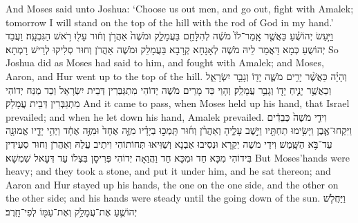 {{And Moses said unto Joshua: ‘Choose us out men, and go out, fight with Amalek; tomorrow I will stand on the top of the hill with the rod of God in my hand.’}{}
{וַיַּ֣עַשׂ יְהוֹשֻׁ֗עַ כַּאֲשֶׁ֤ר אָֽמַר־לוֹ֙ מֹשֶׁ֔ה לְהִלָּחֵ֖ם בַּעֲמָלֵ֑ק וּמֹשֶׁה֙ אַהֲרֹ֣ן וְח֔וּר עָל֖וּ רֹ֥אשׁ הַגִּבְעָֽה׃
}
{וַעֲבַד יְהוֹשֻעַ כְּמָא דַּאֲמַר לֵיהּ מֹשֶׁה לְאָגָחָא קְרָבָא בַּעֲמָלֵק וּמֹשֶׁה אַהֲרֹן וְחוּר סְלִיקוּ לְרֵישׁ רָמְתָא׃}
{So Joshua did as Moses had said to him, and fought with Amalek; and Moses, Aaron, and Hur went up to the top of the hill.}{}
{וְהָיָ֗ה כַּאֲשֶׁ֨ר יָרִ֥ים מֹשֶׁ֛ה יָד֖וֹ וְגָבַ֣ר יִשְׂרָאֵ֑ל וְכַאֲשֶׁ֥ר יָנִ֛יחַ יָד֖וֹ וְגָבַ֥ר עֲמָלֵֽק׃
}
{וְהָוֵי כַּד מָרֵים מֹשֶׁה יְדוֹהִי מִתְגַּבְּרִין דְּבֵית יִשְׂרָאֵל וְכַד מַנַּח יְדוֹהִי מִתְגַּבְּרִין דְּבֵית עֲמָלֵק׃}
{And it came to pass, when Moses held up his hand, that Israel prevailed; and when he let down his hand, Amalek prevailed.}{}
{וִידֵ֤י מֹשֶׁה֙ כְּבֵדִ֔ים וַיִּקְחוּ־אֶ֛בֶן וַיָּשִׂ֥ימוּ תַחְתָּ֖יו וַיֵּ֣שֶׁב עָלֶ֑יהָ וְאַהֲרֹ֨ן וְח֜וּר תָּֽמְכ֣וּ בְיָדָ֗יו מִזֶּ֤ה אֶחָד֙ וּמִזֶּ֣ה אֶחָ֔ד וַיְהִ֥י יָדָ֛יו אֱמוּנָ֖ה עַד־בֹּ֥א הַשָּֽׁמֶשׁ׃
}
{וִידֵי מֹשֶׁה יְקַרָא וּנְסִיבוּ אַבְנָא וְשַׁוִּיאוּ תְּחוֹתוֹהִי וִיתֵיב עֲלַהּ וְאַהֲרֹן וְחוּר סְעִידִין בִּידוֹהִי מִכָּא חַד וּמִכָּא חַד וַהֲוַאָה יְדוֹהִי פְּרִיסָן בִּצְלוֹ עַד דְּעָאל שִׁמְשָׁא׃}
{But Moses’hands were heavy; and they took a stone, and put it under him, and he sat thereon; and Aaron and Hur stayed up his hands, the one on the one side, and the other on the other side; and his hands were steady until the going down of the sun.}{}
{וַיַּחֲלֹ֧שׁ יְהוֹשֻׁ֛עַ אֶת־עֲמָלֵ֥ק וְאֶת־עַמּ֖וֹ לְפִי־חָֽרֶב׃ \petucha 
{}}
}
